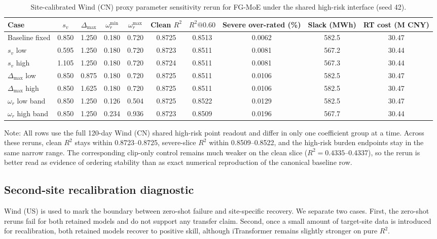 \documentclass[review,1p,times]{elsarticle}
\newcommand{\aeTableNote}[1]{%
  \par\vspace{2pt}%
  \noindent\begin{minipage}{\linewidth}
    \raggedright\footnotesize
    Note: #1
  \end{minipage}%
  \par
}
\begin{document}
\begin{table}[t]
\centering
\caption{Site-calibrated Wind (CN) proxy parameter sensitivity rerun for FG-MoE under the shared high-risk interface (seed 42).}
\label{tab:proxy_coeff_sensitivity}
\scriptsize
\setlength{\tabcolsep}{3.4pt}
\begin{tabular*}{\linewidth}{@{\extracolsep{\fill}}lccccccccc@{}}
\toprule
\textbf{Case} & \textbf{$s_v$} & \textbf{$\Delta_{\max}$} & \textbf{$\omega_r^{\min}$} & \textbf{$\omega_r^{\max}$} & \textbf{Clean $R^2$} & \textbf{$R^2@0.60$} & \textbf{Severe over-rated (\%)} & \textbf{Slack (MWh)} & \textbf{RT cost (M CNY)} \\
\midrule
Baseline fixed & 0.850 & 1.250 & 0.180 & 0.720 & 0.8725 & 0.8513 & 0.0062 & 582.5 & 30.47 \\
$s_v$ low & 0.595 & 1.250 & 0.180 & 0.720 & 0.8723 & 0.8511 & 0.0081 & 567.2 & 30.44 \\
$s_v$ high & 1.105 & 1.250 & 0.180 & 0.720 & 0.8724 & 0.8511 & 0.0081 & 567.3 & 30.44 \\
$\Delta_{\max}$ low & 0.850 & 0.875 & 0.180 & 0.720 & 0.8725 & 0.8511 & 0.0106 & 582.5 & 30.47 \\
$\Delta_{\max}$ high & 0.850 & 1.625 & 0.180 & 0.720 & 0.8725 & 0.8511 & 0.0106 & 582.5 & 30.47 \\
$\omega_r$ low band & 0.850 & 1.250 & 0.126 & 0.504 & 0.8725 & 0.8522 & 0.0129 & 582.5 & 30.47 \\
$\omega_r$ high band & 0.850 & 1.250 & 0.234 & 0.936 & 0.8723 & 0.8509 & 0.0196 & 567.7 & 30.44 \\
\bottomrule
\end{tabular*}
\aeTableNote{All rows use the full 120-day Wind (CN) shared high-risk point readout and differ in only one coefficient group at a time. Across these reruns, clean $R^2$ stays within 0.8723--0.8725, severe-slice $R^2$ within 0.8509--0.8522, and the high-risk burden endpoints stay in the same narrow range. The corresponding clip-only control remains much weaker on the clean slice ($R^2=0.4335$--0.4337), so the rerun is better read as evidence of ordering stability than as exact numerical reproduction of the canonical baseline row.}
\end{table}

\subsection{Second-site recalibration diagnostic}
\label{subsec:second_site_recalibration}
Wind (US) is used to mark the boundary between zero-shot failure and site-specific recovery. We separate two cases. First, the zero-shot reruns fail for both retained models and do not support any transfer claim. Second, once a small amount of target-site data is introduced for recalibration, both retained models recover to positive skill, although iTransformer remains slightly stronger on pure $R^2$.
\end{document}
